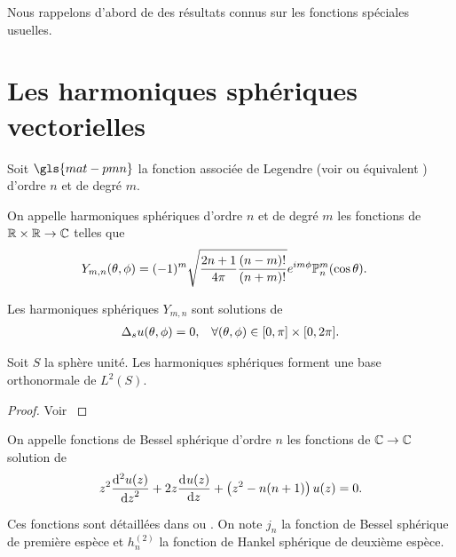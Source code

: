 Nous rappelons d'abord de \cite{nedelec_acoustic_2001} des résultats connus sur les fonctions spéciales usuelles.

\section{Les harmoniques sphériques vectorielles}

    \begin{defn}
        \label{def:sphere:harmoniques_spheriques}
        Soit \(\gls{mat-pmn}\) la fonction associée de Legendre (voir \cite[Chapitre.~8]{abramowitz_handbook_1964} ou équivalent \cite[\url{https://dlmf.nist.gov/14}]{dlmf_nist_2019}) d'ordre \(n\) et de degré \(m\). 

        On appelle harmoniques sphériques d'ordre \(n\) et de degré \(m\) les fonctions de \(\RR\times\RR \rightarrow \CC\) telles que
        \begin{align*}
            Y_{m,n}(\tp) &= (-1)^m\sqrt{\frac{2n+1}{4\pi}\frac{(n-m)!}{(n+m)!}}e^{im\phi}\PP^m_n(\cos \theta).
        \end{align*}
    \end{defn}

    \begin{prop}
        Les harmoniques sphériques \(Y_{m,n}\) sont solutions de 
        \begin{align*}
            \lapls{} u(\tp) = 0, && \forall (\tp) \in [0,\pi]\times[0,2\pi].
        \end{align*}
    \end{prop}
    \begin{prop}
        Soit \(S\) la sphère unité. Les harmoniques sphériques forment une base orthonormale de \(L^2(S)\).
    \end{prop}
    \begin{proof}
        Voir \cite[p.~14]{nedelec_acoustic_2001}
    \end{proof}

    \begin{defn}
        \label{def:sphere:bessel_spheriques}
        On appelle fonctions de Bessel sphérique d'ordre \(n\) les fonctions de \(\CC \rightarrow \CC\) solution de
        \begin{align*}
            z^{2}\ddp[2]{z}{u(z)}+2z\ddp{z}{u(z)}+\left(z^{2}-n(n+1)\right)u(z)=0.
        \end{align*}
    \end{defn}
    Ces fonctions sont détaillées dans \cite[p.~437]{abramowitz_handbook_1964} ou \cite[\url{https://dlmf.nist.gov/10.47}]{dlmf_nist_2019}.
    On note \(j_n\) la fonction de Bessel sphérique de première espèce et \(h^{(2)}_n\) la fonction de Hankel sphérique de deuxième espèce.

